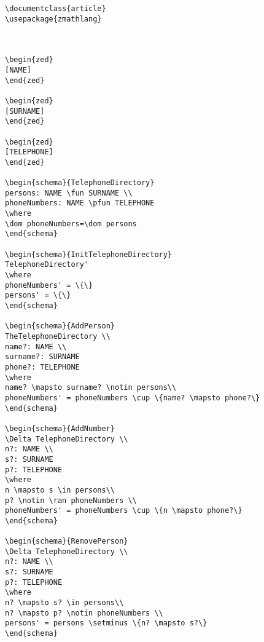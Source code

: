 \begin{verbatim}
\documentclass{article}
\usepackage{zmathlang}



\begin{zed}
[NAME] 
\end{zed}

\begin{zed}
[SURNAME]
\end{zed}

\begin{zed}
[TELEPHONE]
\end{zed}

\begin{schema}{TelephoneDirectory}
persons: NAME \fun SURNAME \\ 
phoneNumbers: NAME \pfun TELEPHONE
\where 
\dom phoneNumbers=\dom persons
\end{schema}

\begin{schema}{InitTelephoneDirectory} 
TelephoneDirectory' 
\where 
phoneNumbers' = \{\}
persons' = \{\}
\end{schema}

\begin{schema}{AddPerson}
TheTelephoneDirectory \\
name?: NAME \\
surname?: SURNAME
phone?: TELEPHONE
\where
name? \mapsto surname? \notin persons\\
phoneNumbers' = phoneNumbers \cup \{name? \mapsto phone?\}
\end{schema}

\begin{schema}{AddNumber}
\Delta TelephoneDirectory \\
n?: NAME \\
s?: SURNAME
p?: TELEPHONE
\where
n \mapsto s \in persons\\
p? \notin \ran phoneNumbers \\
phoneNumbers' = phoneNumbers \cup \{n \mapsto phone?\}
\end{schema}

\begin{schema}{RemovePerson}
\Delta TelephoneDirectory \\
n?: NAME \\
s?: SURNAME
p?: TELEPHONE
\where
n? \mapsto s? \in persons\\
n? \mapsto p? \notin phoneNumbers \\
persons' = persons \setminus \{n? \mapsto s?\}
\end{schema}


\end{verbatim}
